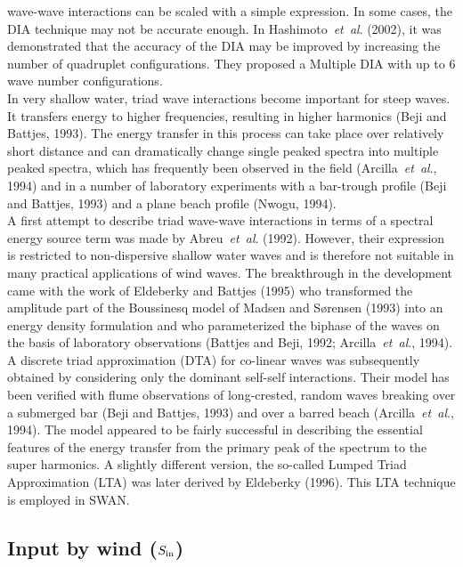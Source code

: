 \documentclass[12pt]{book}
\begin{document}
wave-wave interactions can be scaled with a simple expression.
In some cases, the DIA technique may not be accurate enough. In Hashimoto~{\it et~al}. (2002), it was
demonstrated that the accuracy of the DIA may be improved by increasing the number of quadruplet
configurations. They proposed a Multiple DIA with up to 6 wave number configurations.
\\[2ex]
\noindent
In very shallow water, triad wave interactions become important for steep waves. It
transfers energy to higher frequencies, resulting in higher harmonics (Beji and Battjes, 1993).
The energy transfer in this process can take place over relatively short distance and can
dramatically change single peaked spectra into multiple peaked spectra, which has frequently
been observed in the field (Arcilla~{\it et~al}., 1994) and in a number of laboratory
experiments with a bar-trough profile (Beji and Battjes, 1993) and a plane beach profile
(Nwogu, 1994).
\\[2ex]
\noindent
A first attempt to describe triad wave-wave interactions in terms of a spectral energy source term was
made by Abreu~{\it et~al}. (1992). However, their expression is restricted to non-dispersive shallow water
waves and is therefore not suitable in many practical applications of wind waves. The breakthrough in the
development came with the work of Eldeberky and Battjes (1995) who transformed the amplitude part of
the Boussinesq model of Madsen and S{\o}rensen (1993) into an energy density formulation and who
parameterized the biphase of the waves on the basis of laboratory observations (Battjes and Beji, 1992;
Arcilla~{\it et~al}., 1994). A discrete triad approximation (DTA) for co-linear waves was subsequently
obtained by considering only the dominant self-self interactions. Their model has been verified with flume
observations of long-crested, random waves breaking over a submerged bar (Beji and Battjes, 1993) and
over a barred beach (Arcilla~{\it et~al}., 1994). The model appeared to be fairly successful in describing
the essential features of the energy transfer from the primary peak of the spectrum to the super harmonics.
A slightly different version, the so-called Lumped Triad Approximation (LTA) was later derived by
Eldeberky (1996). This LTA technique is employed in SWAN.
\nocite{Bej93B,Res01PTV,Vle03B,You93V,Has85HAB,Has81H,Has02HH,Abr92LT,Eld95B,Mad93S,Eld96}

\subsection{Input by wind ($S_{\rm in}$)} \label{sec:inpwn}
\end{document}
